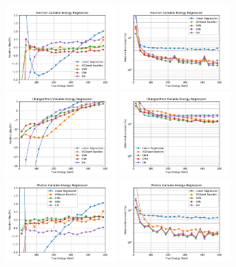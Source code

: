 \begin{figure}[htbp]
\centering
\includegraphics[width=0.38\textwidth]{Images/Calo/bias_vs_E_Ele_variable.pdf}
\includegraphics[width=0.38\textwidth]{Images/Calo/res_vs_E_Ele_variable.pdf} \\
\includegraphics[width=0.38\textwidth]{Images/Calo/bias_vs_E_ChPi_variable.pdf}
\includegraphics[width=0.38\textwidth]{Images/Calo/res_vs_E_ChPi_variable.pdf} \\
\includegraphics[width=0.38\textwidth]{Images/Calo/bias_vs_E_Gamma_variable.pdf}
\includegraphics[width=0.38\textwidth]{Images/Calo/res_vs_E_Gamma_variable.pdf}\\

\end{figure}
